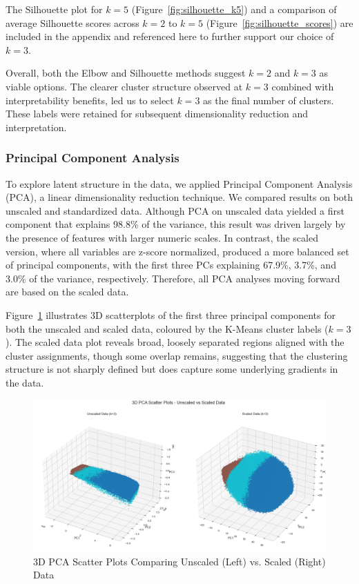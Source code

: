 \documentclass{article}
\begin{document}
The Silhouette plot for $k=5$ (Figure~\ref{fig:silhouette_k5}) and a comparison of average Silhouette scores across $k=2$ to $k=5$ (Figure~\ref{fig:silhouette_scores}) are included in the appendix and referenced here to further support our choice of $k=3$.

Overall, both the Elbow and Silhouette methods suggest $k=2$ and $k=3$ as viable options. The clearer cluster structure observed at $k=3$ combined with interpretability benefits, led us to select $k=3$ as the final number of clusters. These labels were retained for subsequent dimensionality reduction and interpretation.


\subsubsection{Principal Component Analysis}

To explore latent structure in the data, we applied Principal Component Analysis (PCA), a linear dimensionality reduction technique. We compared results on both unscaled and standardized data. Although PCA on unscaled data yielded a first component that explains 98.8\% of the variance, this result was driven largely by the presence of features with larger numeric scales. In contrast, the scaled version, where all variables are z-score normalized, produced a more balanced set of principal components, with the first three PCs explaining 67.9\%, 3.7\%, and 3.0\% of the variance, respectively. Therefore, all PCA analyses moving forward are based on the scaled data.

Figure~\ref{fig:pca3d} illustrates 3D scatterplots of the first three principal components for both the unscaled and scaled data, coloured by the K-Means cluster labels ($k=3$). The scaled data plot reveals broad, loosely separated regions aligned with the cluster assignments, though some overlap remains, suggesting that the clustering structure is not sharply defined but does capture some underlying gradients in the data.

\begin{figure}[H]
    \centering
    \includegraphics[width=\textwidth]{figures/pca3d_scaled_vs_unscaled.png}
    \caption{3D PCA Scatter Plots Comparing Unscaled (Left) vs. Scaled (Right) Data}
    \label{fig:pca3d}
\end{figure}
\end{document}
